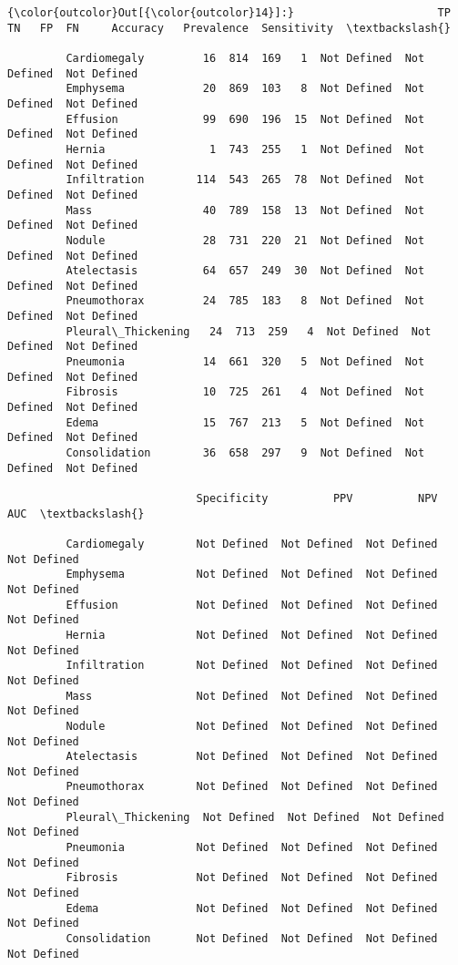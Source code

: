 \documentclass[11pt]{article}
\begin{document}
\begin{Verbatim}[commandchars=\\\{\}]
{\color{outcolor}Out[{\color{outcolor}14}]:}                      TP   TN   FP  FN     Accuracy   Prevalence  Sensitivity  \textbackslash{}
                                                                                        
         Cardiomegaly         16  814  169   1  Not Defined  Not Defined  Not Defined   
         Emphysema            20  869  103   8  Not Defined  Not Defined  Not Defined   
         Effusion             99  690  196  15  Not Defined  Not Defined  Not Defined   
         Hernia                1  743  255   1  Not Defined  Not Defined  Not Defined   
         Infiltration        114  543  265  78  Not Defined  Not Defined  Not Defined   
         Mass                 40  789  158  13  Not Defined  Not Defined  Not Defined   
         Nodule               28  731  220  21  Not Defined  Not Defined  Not Defined   
         Atelectasis          64  657  249  30  Not Defined  Not Defined  Not Defined   
         Pneumothorax         24  785  183   8  Not Defined  Not Defined  Not Defined   
         Pleural\_Thickening   24  713  259   4  Not Defined  Not Defined  Not Defined   
         Pneumonia            14  661  320   5  Not Defined  Not Defined  Not Defined   
         Fibrosis             10  725  261   4  Not Defined  Not Defined  Not Defined   
         Edema                15  767  213   5  Not Defined  Not Defined  Not Defined   
         Consolidation        36  658  297   9  Not Defined  Not Defined  Not Defined   
         
                             Specificity          PPV          NPV          AUC  \textbackslash{}
                                                                                  
         Cardiomegaly        Not Defined  Not Defined  Not Defined  Not Defined   
         Emphysema           Not Defined  Not Defined  Not Defined  Not Defined   
         Effusion            Not Defined  Not Defined  Not Defined  Not Defined   
         Hernia              Not Defined  Not Defined  Not Defined  Not Defined   
         Infiltration        Not Defined  Not Defined  Not Defined  Not Defined   
         Mass                Not Defined  Not Defined  Not Defined  Not Defined   
         Nodule              Not Defined  Not Defined  Not Defined  Not Defined   
         Atelectasis         Not Defined  Not Defined  Not Defined  Not Defined   
         Pneumothorax        Not Defined  Not Defined  Not Defined  Not Defined   
         Pleural\_Thickening  Not Defined  Not Defined  Not Defined  Not Defined   
         Pneumonia           Not Defined  Not Defined  Not Defined  Not Defined   
         Fibrosis            Not Defined  Not Defined  Not Defined  Not Defined   
         Edema               Not Defined  Not Defined  Not Defined  Not Defined   
         Consolidation       Not Defined  Not Defined  Not Defined  Not Defined   
         

\end{Verbatim}
\end{document}
